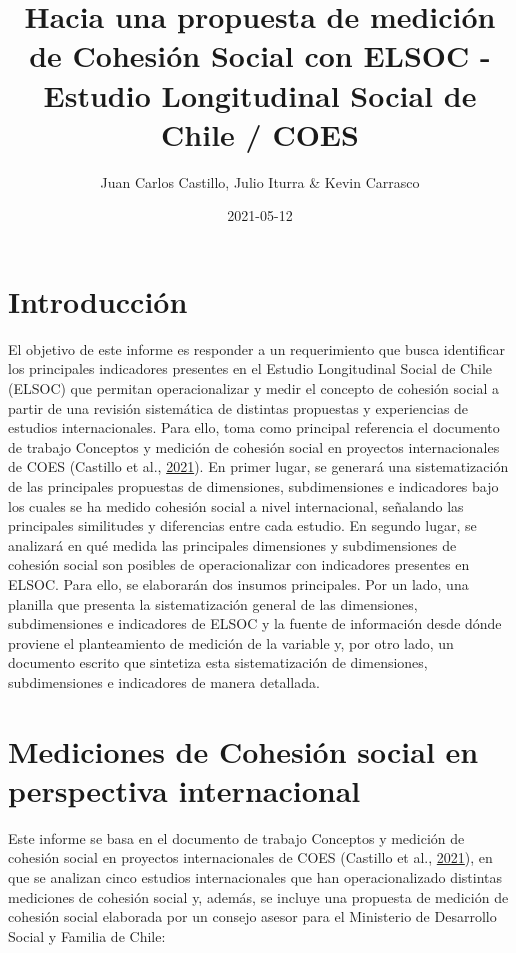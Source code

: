 \documentclass[
  12pt,
]{book}
\title{Hacia una propuesta de medición de Cohesión Social con ELSOC - Estudio Longitudinal Social de Chile / COES}
\author{Juan Carlos Castillo, Julio Iturra \& Kevin Carrasco}
\date{2021-05-12}
\begin{document}
\maketitle

{
\hypersetup{linkcolor=}
\setcounter{tocdepth}{1}
\tableofcontents
}
\listoftables
\listoffigures
{}
\hypertarget{introducciuxf3n}{%
\chapter{Introducción}\label{introducciuxf3n}}

El objetivo de este informe es responder a un requerimiento que busca identificar los principales indicadores presentes en el Estudio Longitudinal Social de Chile (ELSOC) que permitan operacionalizar y medir el concepto de cohesión social a partir de una revisión sistemática de distintas propuestas y experiencias de estudios internacionales. Para ello, toma como principal referencia el documento de trabajo Conceptos y medición de cohesión social en proyectos internacionales de COES (Castillo et al., \protect\hyperlink{ref-castillo_Conceptos_2021}{2021}). En primer lugar, se generará una sistematización de las principales propuestas de dimensiones, subdimensiones e indicadores bajo los cuales se ha medido cohesión social a nivel internacional, señalando las principales similitudes y diferencias entre cada estudio. En segundo lugar, se analizará en qué medida las principales dimensiones y subdimensiones de cohesión social son posibles de operacionalizar con indicadores presentes en ELSOC. Para ello, se elaborarán dos insumos principales. Por un lado, una planilla que presenta la sistematización general de las dimensiones, subdimensiones e indicadores de ELSOC y la fuente de información desde dónde proviene el planteamiento de medición de la variable y, por otro lado, un documento escrito que sintetiza esta sistematización de dimensiones, subdimensiones e indicadores de manera detallada.

\hypertarget{mediciones-de-cohesiuxf3n-social-en-perspectiva-internacional}{%
\chapter{Mediciones de Cohesión social en perspectiva internacional}\label{mediciones-de-cohesiuxf3n-social-en-perspectiva-internacional}}

Este informe se basa en el documento de trabajo Conceptos y medición de cohesión social en proyectos internacionales de COES (Castillo et al., \protect\hyperlink{ref-castillo_Conceptos_2021}{2021}), en que se analizan cinco estudios internacionales que han operacionalizado distintas mediciones de cohesión social y, además, se incluye una propuesta de medición de cohesión social elaborada por un consejo asesor para el Ministerio de Desarrollo Social y Familia de Chile:
\end{document}
